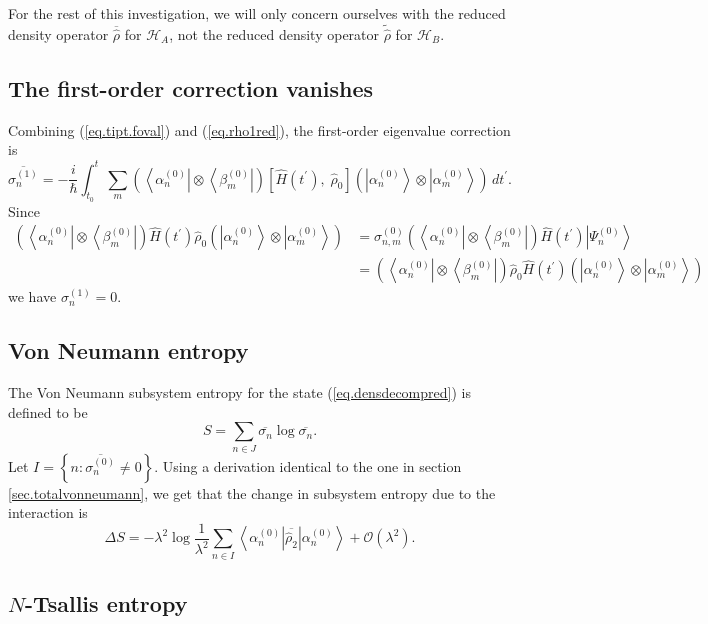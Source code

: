 \documentclass[11pt]{article}
\newcommand{\Od}[1]{\mathcal{O}{\left(#1\right)}}
\newcommand{\bra}[1]{\left\langle#1\right|}
\newcommand{\ket}[1]{\left|#1\right\rangle}
\newcommand{\hilb}{\mathcal{H}}
\newcommand{\op}[1]{\hat{#1}}
\theoremstyle{theorem}
\theoremstyle{remark}
\theoremstyle{step}
\theoremstyle{gap}
\begin{document}
For the rest of this investigation, we will only concern ourselves with the reduced density operator \(\overline{\op{\rho}}\) for \(\hilb_A\), not the reduced density operator \(\widetilde{\op{\rho}}\) for \(\hilb_B\).

\subsection{The first-order correction vanishes}

Combining (\ref{eq.tipt.foval}) and (\ref{eq.rho1red}), the first-order eigenvalue correction is
\[
\overline{\sigma_n^{(1)}} = -\frac{i}{\hbar} \int_{t_0}^t \sum_m \left(\bra{\alpha_n^{(0)}}\otimes\bra{\beta_m^{(0)}}\right) \left[\op{H}(t^\prime),\; \op{\rho}_0 \right] \left(\ket{\alpha_n^{(0)}}\otimes\ket{\alpha_m^{(0)}}\right)\,dt^\prime.
\]
Since
\begin{align*}
\left(\bra{\alpha_n^{(0)}}\otimes\bra{\beta_m^{(0)}}\right) \op{H}(t^\prime) \op{\rho}_0 \left(\ket{\alpha_n^{(0)}}\otimes\ket{\alpha_m^{(0)}}\right) 
&= 
\sigma_{n,m}^{(0)} \left(\bra{\alpha_n^{(0)}}\otimes\bra{\beta_m^{(0)}}\right) \op{H}(t^\prime) \ket{\Psi_n^{(0)}} 
\\&=
 \left(\bra{\alpha_n^{(0)}}\otimes\bra{\beta_m^{(0)}}\right) \op{\rho}_0 \op{H}(t^\prime) \left(\ket{\alpha_n^{(0)}}\otimes\ket{\alpha_m^{(0)}}\right)
\end{align*}
we have \(\sigma_n^{(1)} = 0\).


\subsection{Von Neumann entropy}

The Von Neumann subsystem entropy for the state (\ref{eq.densdecompred}) is defined to be
\[
S = \sum_{n\in J} \overline{\sigma_n} \log \overline{\sigma_n}.
\]
Let \(I = \left\{n: \overline{\sigma_n^{(0)}} \neq 0\right\}\). Using a derivation identical to the one in section \ref{sec.totalvonneumann}, we get that the change in subsystem entropy due to the interaction is
\begin{equation}\label{eq.subentropyresultwithrho2}
\boxed{\Delta S = -\lambda^2 \log\frac{1}{\lambda^2}\sum_{n \in I} \bra{{\alpha_n^{(0)}}}\overline{\op{\rho}_2}\ket{{\alpha_n^{(0)}}} + \Od{\lambda^2}.}
\end{equation}

\subsection{\(N\)-Tsallis entropy}
\end{document}
